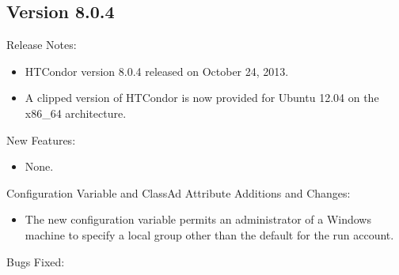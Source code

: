 \subsection*{\label{sec:New-8-0-4}Version 8.0.4}

\noindent Release Notes:

\begin{itemize}

\item HTCondor version 8.0.4 released on October 24, 2013.

\item A clipped version of HTCondor is now provided for Ubuntu 12.04 
on the x86\_64 architecture.

\end{itemize}


\noindent New Features:

\begin{itemize}

\item None.

\end{itemize}

\noindent Configuration Variable and ClassAd Attribute Additions and Changes:

\begin{itemize}

\item The new configuration variable 
permits an administrator of a Windows machine to specify a local group other 
than the default  for the  run account.

\end{itemize}

\noindent Bugs Fixed:

